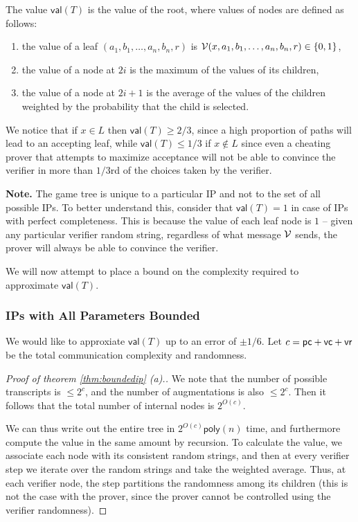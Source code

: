 \begin{definition}[Value]
	The value $\mathsf{val}(T)$ is the value of the root, where values of nodes are defined as follows:
	\begin{enumerate}
		\item the value of a leaf $(a_1,b_1,\dots,a_n,b_n,r)$ is $\mathcal{V}(x, a_1, b_1,\dots,a_n, b_n,r)\in\{{0,1}\}$,
		\item the value of a node at $2i$ is the maximum of the values of its children,
		\item the value of a node at $2i+1$ is the average of the values of the children weighted by the probability that the child is selected.
	\end{enumerate}
\end{definition}

We notice that if $x\in L$ then $\mathsf{val}(T)\geq 2/3$, since a high proportion of paths will lead to an accepting leaf, while $\mathsf{val}(T)\leq 1/3$ if $x\notin L$ since even a cheating prover that attempts to maximize acceptance will not be able to convince the verifier in more than $1/3$rd of the choices taken by the verifier.

\textbf{Note.} The game tree is unique to a particular IP and not to the set of all possible IPs. To better understand this, consider that $\mathsf{val}(T)=1$ in case of IPs with perfect completeness. This is because the value of each leaf node is $1$ -- given any particular verifier random string, regardless of what message $\mathcal{V}$ sends, the prover will always be able to convince the verifier. 

We will now attempt to place a bound on the complexity required to approximate $\mathsf{val}(T)$.

\subsubsection{IPs with All Parameters Bounded}

We would like to approxiate $\mathsf{val}(T)$ up to an error of $\pm 1/6$. Let $c=\mathsf{pc}+\mathsf{vc}+\mathsf{vr}$ be the total communication complexity and randomness.

\begin{proof}[Proof of theorem \ref{thm:boundedip} (a).]
	We note that the number of possible transcripts is $\leq 2^c$, and the number of augmentations is also $\leq 2^c$. Then it follows that the total number of internal nodes is $2^{O(c)}$.
	
	We can thus write out the entire tree in $2^{O(c)}\mathsf{poly}(n)$ time, and furthermore compute the value in the same amount by recursion. To calculate the value, we associate each node with its consistent random strings, and then at every verifier step we iterate over the random strings and take the weighted average. Thus, at each verifier node, the step partitions the randomness among its children (this is not the case with the prover, since the prover cannot be controlled using the verifier randomness).
\end{proof}

